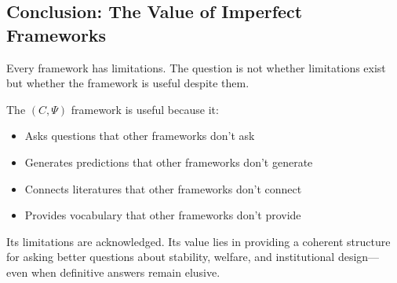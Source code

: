 \subsection{Conclusion: The Value of Imperfect Frameworks}

Every framework has limitations. The question is not whether limitations exist
but whether the framework is useful despite them.

The $(C, \Psi)$ framework is useful because it:
\begin{itemize}
  \item Asks questions that other frameworks don't ask
  \item Generates predictions that other frameworks don't generate
  \item Connects literatures that other frameworks don't connect
  \item Provides vocabulary that other frameworks don't provide
\end{itemize}

Its limitations are acknowledged. Its value lies in providing
a coherent structure for asking better questions about
stability, welfare, and institutional design---
even when definitive answers remain elusive.

